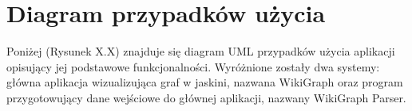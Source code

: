 \section{Diagram przypadków użycia}
Poniżej (Rysunek X.X) znajduje się diagram UML przypadków użycia aplikacji opisujący jej podstawowe funkcjonalności. Wyróżnione zostały dwa systemy: główna aplikacja wizualizująca graf w jaskini, nazwana WikiGraph oraz program przygotowujący dane wejściowe do głównej aplikacji, nazwany WikiGraph Parser.
